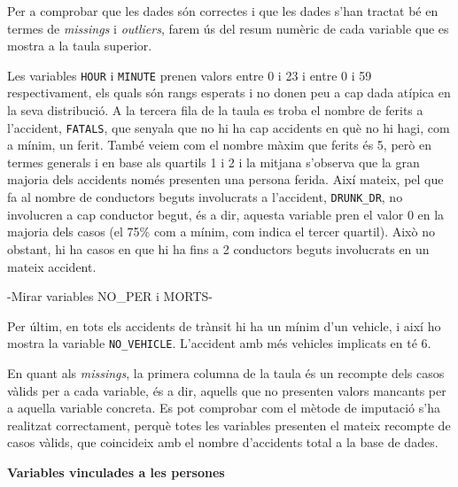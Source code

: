 \documentclass[11pt,longbibliography]{article}
\theoremstyle{definition}
\theoremstyle{remark}
\begin{document}
Per a comprobar que les dades són correctes i que les dades s'han tractat bé en termes de \emph{missings} i \emph{outliers}, farem ús del resum numèric de cada variable que es mostra a la taula superior. 


Les variables \texttt{HOUR} i \texttt{MINUTE} prenen valors entre 0 i 23 i entre 0 i 59 respectivament, els quals són rangs esperats i no donen peu a cap dada atípica en la seva distribució. A la tercera fila de la taula es troba el nombre de ferits a l'accident, \texttt{FATALS}, que senyala que no hi ha cap accidents en què no hi hagi, com a mínim, un ferit. També veiem com el nombre màxim que ferits és 5, però en termes generals i en base als quartils 1 i 2 i la mitjana s'observa que la gran majoria dels accidents només presenten una persona ferida. Així mateix, pel que fa al nombre de conductors beguts involucrats a l'accident, \texttt{DRUNK\_DR}, no involucren a cap conductor begut, és a dir, aquesta variable pren el valor 0 en la majoria dels casos (el 75\% com a mínim, com indica el tercer quartil). Això no obstant, hi ha casos en que hi ha fins a 2 conductors beguts involucrats en un mateix accident. 


-Mirar variables NO\_PER i MORTS-


Per últim, en tots els accidents de trànsit hi ha un mínim d'un vehicle, i així ho mostra la variable \texttt{NO\_VEHICLE}. L'accident amb més vehicles implicats en té 6.


En quant als \emph{missings}, la primera columna de la taula és un recompte dels casos vàlids per a cada variable, és a dir, aquells que no presenten valors mancants per a aquella variable concreta. Es pot comprobar com el mètode de imputació s'ha realitzat correctament, perquè totes les variables presenten el mateix recompte de casos vàlids, que coincideix amb el nombre d'accidents total a la base de dades.

\textbf{Variables vinculades a les persones}
\end{document}

